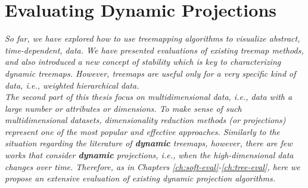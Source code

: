 \chapter{Evaluating Dynamic Projections}
\label{ch:proj-eval}



\textit{
So far, we have explored how to use treemapping algorithms to visualize abstract, time-dependent, data. We have presented evaluations of existing treemap methods, and also introduced a new concept of stability which is key to characterizing dynamic treemaps. However, treemaps are useful only for a very specific kind of data, i.e., weighted hierarchical data. \\
The second part of this thesis focus on multidimensional data, i.e., data with a large number or attributes or dimensions. To make sense of such multidimensional datasets, dimensionality reduction methods (or projections) represent one of the most popular and effective approaches. Similarly to the situation regarding the literature of \textbf{dynamic} treemaps, however, there are few works that consider \textbf{dynamic} projections, i.e., when the high-dimensional data changes over time. Therefore, as in Chapters \ref{ch:soft-eval}-\ref{ch:tree-eval}, here we propose an extensive evaluation of existing dynamic projection algorithms.
}

\vspace{5mm} %


